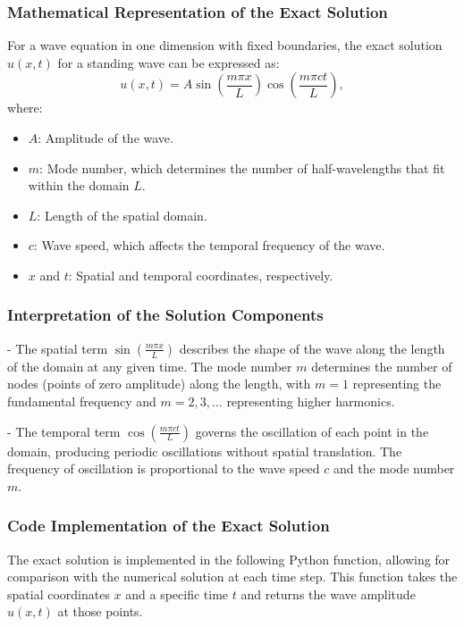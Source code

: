 \documentclass{article}
\begin{document}
		 \subsubsection{Mathematical Representation of the Exact Solution}
		 
		 For a wave equation in one dimension with fixed boundaries, the exact solution \( u(x, t) \) for a standing wave can be expressed as:
		 \[
		 u(x, t) = A \sin\left( \frac{m \pi x}{L} \right) \cos\left( \frac{m \pi c t}{L} \right),
		 \]
		 where:
		 \begin{itemize}
		 	\item \( A \): Amplitude of the wave.
		 	\item \( m \): Mode number, which determines the number of half-wavelengths that fit within the domain \( L \).
		 	\item \( L \): Length of the spatial domain.
		 	\item \( c \): Wave speed, which affects the temporal frequency of the wave.
		 	\item \( x \) and \( t \): Spatial and temporal coordinates, respectively.
		 \end{itemize}
		 
		 \subsubsection{Interpretation of the Solution Components}
		 
		 - The spatial term \( \sin\left( \frac{m \pi x}{L} \right) \) describes the shape of the wave along the length of the domain at any given time. The mode number \( m \) determines the number of nodes (points of zero amplitude) along the length, with \( m = 1 \) representing the fundamental frequency and \( m = 2, 3, \dots \) representing higher harmonics.
		 
		 - The temporal term \( \cos\left( \frac{m \pi c t}{L} \right) \) governs the oscillation of each point in the domain, producing periodic oscillations without spatial translation. The frequency of oscillation is proportional to the wave speed \( c \) and the mode number \( m \).
		 
		 \subsubsection{Code Implementation of the Exact Solution}
		 
		 The exact solution is implemented in the following Python function, allowing for comparison with the numerical solution at each time step. This function takes the spatial coordinates \( x \) and a specific time \( t \) and returns the wave amplitude \( u(x, t) \) at those points.
		 
\end{document}
